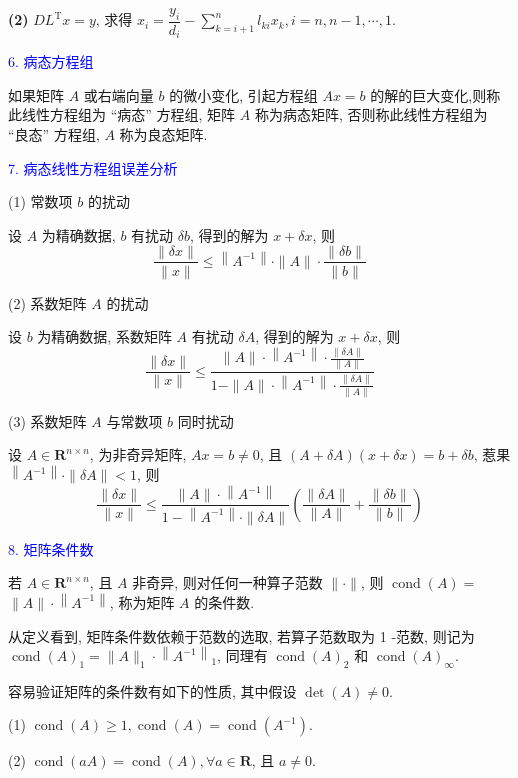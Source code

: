 \textbf{(2)} $ D L^{\mathrm{T}} x=y $, 求得 $ x_{i}=\dfrac{y_{i}}{d_{i}}-\sum\limits_{k=i+1}^{n} l_{k i} x_{k}, i=n, n-1, \cdots, 1 $.

\textcolor{blue}{6. 病态方程组}

如果矩阵 $ A $ 或右端向量 $ b $ 的微小变化, 引起方程组 $ A x=b $ 的解的巨大变化,则称此线性方程组为 “病态” 方程组, 矩阵 $ A $ 称为病态矩阵, 否则称此线性方程组为 “良态” 方程组, $ A $ 称为良态矩阵.

\textcolor{blue}{7. 病态线性方程组误差分析}

(1) 常数项 $ b $ 的扰动

设 $ A $ 为精确数据, $ b $ 有扰动 $ \delta b $, 得到的解为 $ x+\delta x $, 则
$$
\frac{\|\delta x\|}{\|x\|} \leqslant\left\|A^{-1}\right\| \cdot\|A\| \cdot \frac{\|\delta b\|}{\|b\|}
$$

(2) 系数矩阵 $ A $ 的扰动

设 $ b $ 为精确数据, 系数矩阵 $ A $ 有扰动 $ \delta A $, 得到的解为 $ x+\delta x $, 则
$$
\frac{\|\delta x\|}{\|x\|} \leqslant \frac{\|A\| \cdot\left\|A^{-1}\right\| \cdot \frac{\|\delta A\|}{\|A\|}}{1-\|A\| \cdot\left\|A^{-1}\right\| \cdot \frac{\|\delta A\|}{\|A\|}}
$$

(3) 系数矩阵 $ A $ 与常数项 $ b $ 同时扰动

设 $ A \in \mathbf{R}^{n \times n} $, 为非奇异矩阵, $ A x=b \neq 0 $, 且 $ (A+\delta A)(x+\delta x)=b+\delta b $, 惹果 $ \left\|A^{-1}\right\| \cdot\|\delta A\|<1 $, 则
$$
\frac{\|\delta x\|}{\|x\|} \leqslant \frac{\|A\| \cdot\left\|A^{-1}\right\|}{1-\left\|A^{-1}\right\| \cdot\|\delta A\|}\left(\frac{\|\delta A\|}{\|A\|}+\frac{\|\delta b\|}{\|b\|}\right)
$$

\textcolor{blue}{8. 矩阵条件数}

若 $ A \in \mathbf{R}^{n \times n} $, 且 $ A $ 非奇异, 则对任何一种算子范数 $ \|\cdot\| $, 则 $ \operatorname{cond}(A)= $ $ \|A\| \cdot\left\|A^{-1}\right\| $, 称为矩阵 $ A $ 的条件数.

从定义看到, 矩阵条件数依赖于范数的选取, 若算子范数取为 1 -范数, 则记为 $ \operatorname{cond}(A)_{1}=\|A\|_{1} \cdot\left\|A^{-1}\right\|_{1} $, 同理有 $ \operatorname{cond}(A)_{2} $ 和 $ \operatorname{cond}(A)_{\infty} $.

容易验证矩阵的条件数有如下的性质, 其中假设 $ \operatorname{det}(A) \neq 0 $.

(1) $ \operatorname{cond}(A) \geqslant 1, \operatorname{cond}(A)=\operatorname{cond}\left(A^{-1}\right) $.

(2) $ \operatorname{cond}(a A)=\operatorname{cond}(A), \forall a \in \mathbf{R} $, 且 $ a \neq 0 $.

